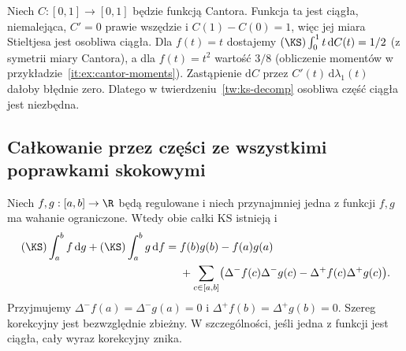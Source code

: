 \begin{przyklad}
Niech $C:[0,1]\to[0,1]$ będzie funkcją Cantora. Funkcja ta jest ciągła, niemalejąca, $C'=0$ prawie wszędzie i $C(1)-C(0)=1$, więc jej miara Stieltjesa jest osobliwa ciągła. Dla $f(t)=t$ dostajemy $(\KS)\int_0^1 t\,\mathrm dC(t)=1/2$ (z symetrii miary Cantora), a dla $f(t)=t^2$ wartość $3/8$ (obliczenie momentów w przykładzie~\ref{it:ex:cantor-moments}). Zastąpienie $\mathrm dC$ przez $C'(t)\,\mathrm d\lambda_1(t)$ dałoby błędnie zero. Dlatego w twierdzeniu~\ref{tw:ks-decomp} osobliwa część ciągła jest niezbędna.
\end{przyklad}

\subsection*{Całkowanie przez części ze wszystkimi poprawkami skokowymi}
\begin{twierdzenie}
\label{tw:ks-ibp}
Niech $f,g:[a,b]\to\R$ będą regulowane i niech przynajmniej jedna z funkcji $f,g$ ma wahanie ograniczone. Wtedy obie całki KS istnieją i
\[
 \begin{aligned}
 (\KS)\int_a^b f\,\mathrm dg+(\KS)\int_a^b g\,\mathrm df
 ={}&f(b)g(b)-f(a)g(a)\\
 &+\sum_{c\in[a,b]}\bigl(\Delta^-f(c)\Delta^-g(c)
 -\Delta^+f(c)\Delta^+g(c)\bigr).
 \end{aligned}
\]
Przyjmujemy $\Delta^-f(a)=\Delta^-g(a)=0$ i $\Delta^+f(b)=\Delta^+g(b)=0$. Szereg korekcyjny jest bezwzględnie zbieżny. W szczególności, jeśli jedna z funkcji jest ciągła, cały wyraz korekcyjny znika.
\end{twierdzenie}
